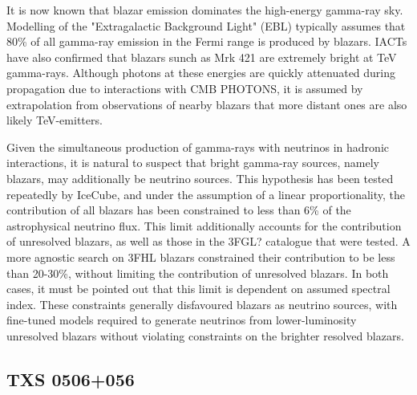 It is now known that blazar emission dominates the high-energy gamma-ray sky. Modelling of the "Extragalactic Background Light" (EBL) typically assumes that 80\% of all gamma-ray emission in the Fermi range is produced by blazars. IACTs have also confirmed that blazars sunch as Mrk 421 are extremely bright at TeV gamma-rays. Although photons at these energies are quickly attenuated during propagation due to interactions with CMB PHOTONS, it is assumed by extrapolation from observations of nearby blazars that more distant ones are also likely TeV-emitters.

 Given the simultaneous production of gamma-rays with neutrinos in hadronic interactions, it is natural to suspect that bright gamma-ray sources, namely blazars, may additionally be neutrino sources. This hypothesis has been tested repeatedly by IceCube, and under the assumption of a linear proportionality, the contribution of all blazars has been constrained to less than 6\% of the astrophysical neutrino flux. This limit additionally accounts for the contribution of unresolved blazars, as well as those in the 3FGL? catalogue that were tested. A more agnostic search on 3FHL blazars constrained their contribution to be less than 20-30\%, without limiting the contribution of unresolved blazars. In both cases, it must be pointed out that this limit is dependent on assumed spectral index. These constraints generally disfavoured blazars as neutrino sources, with fine-tuned models required to generate neutrinos from lower-luminosity unresolved blazars without violating constraints on the brighter resolved blazars. 
 
 \subsection{TXS 0506+056}
 
